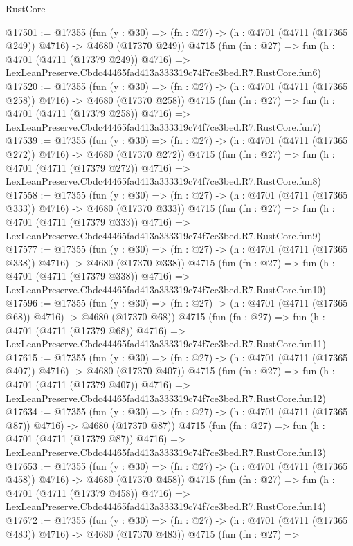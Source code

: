 \begin{lexlean}{RustCore}
\begin{coremodule}
@17501 := @17355
    (fun (y : @30) => (fn : @27) -> (h : @4701 (@4711 (@17365 @249)) @4716) -> @4680 (@17370 @249))
    @4715
    (fun (fn : @27) =>
    fun (h : @4701 (@4711 (@17379 @249)) @4716) =>
    LexLeanPreserve.Cbdc44465fad413a333319c74f7ce3bed.R7.RustCore.fun6)
@17520 := @17355
    (fun (y : @30) => (fn : @27) -> (h : @4701 (@4711 (@17365 @258)) @4716) -> @4680 (@17370 @258))
    @4715
    (fun (fn : @27) =>
    fun (h : @4701 (@4711 (@17379 @258)) @4716) =>
    LexLeanPreserve.Cbdc44465fad413a333319c74f7ce3bed.R7.RustCore.fun7)
@17539 := @17355
    (fun (y : @30) => (fn : @27) -> (h : @4701 (@4711 (@17365 @272)) @4716) -> @4680 (@17370 @272))
    @4715
    (fun (fn : @27) =>
    fun (h : @4701 (@4711 (@17379 @272)) @4716) =>
    LexLeanPreserve.Cbdc44465fad413a333319c74f7ce3bed.R7.RustCore.fun8)
@17558 := @17355
    (fun (y : @30) => (fn : @27) -> (h : @4701 (@4711 (@17365 @333)) @4716) -> @4680 (@17370 @333))
    @4715
    (fun (fn : @27) =>
    fun (h : @4701 (@4711 (@17379 @333)) @4716) =>
    LexLeanPreserve.Cbdc44465fad413a333319c74f7ce3bed.R7.RustCore.fun9)
@17577 := @17355
    (fun (y : @30) => (fn : @27) -> (h : @4701 (@4711 (@17365 @338)) @4716) -> @4680 (@17370 @338))
    @4715
    (fun (fn : @27) =>
    fun (h : @4701 (@4711 (@17379 @338)) @4716) =>
    LexLeanPreserve.Cbdc44465fad413a333319c74f7ce3bed.R7.RustCore.fun10)
@17596 := @17355
    (fun (y : @30) => (fn : @27) -> (h : @4701 (@4711 (@17365 @68)) @4716) -> @4680 (@17370 @68))
    @4715
    (fun (fn : @27) =>
    fun (h : @4701 (@4711 (@17379 @68)) @4716) =>
    LexLeanPreserve.Cbdc44465fad413a333319c74f7ce3bed.R7.RustCore.fun11)
@17615 := @17355
    (fun (y : @30) => (fn : @27) -> (h : @4701 (@4711 (@17365 @407)) @4716) -> @4680 (@17370 @407))
    @4715
    (fun (fn : @27) =>
    fun (h : @4701 (@4711 (@17379 @407)) @4716) =>
    LexLeanPreserve.Cbdc44465fad413a333319c74f7ce3bed.R7.RustCore.fun12)
@17634 := @17355
    (fun (y : @30) => (fn : @27) -> (h : @4701 (@4711 (@17365 @87)) @4716) -> @4680 (@17370 @87))
    @4715
    (fun (fn : @27) =>
    fun (h : @4701 (@4711 (@17379 @87)) @4716) =>
    LexLeanPreserve.Cbdc44465fad413a333319c74f7ce3bed.R7.RustCore.fun13)
@17653 := @17355
    (fun (y : @30) => (fn : @27) -> (h : @4701 (@4711 (@17365 @458)) @4716) -> @4680 (@17370 @458))
    @4715
    (fun (fn : @27) =>
    fun (h : @4701 (@4711 (@17379 @458)) @4716) =>
    LexLeanPreserve.Cbdc44465fad413a333319c74f7ce3bed.R7.RustCore.fun14)
@17672 := @17355
    (fun (y : @30) => (fn : @27) -> (h : @4701 (@4711 (@17365 @483)) @4716) -> @4680 (@17370 @483))
    @4715
    (fun (fn : @27) =>

\end{coremodule}
\end{lexlean}
